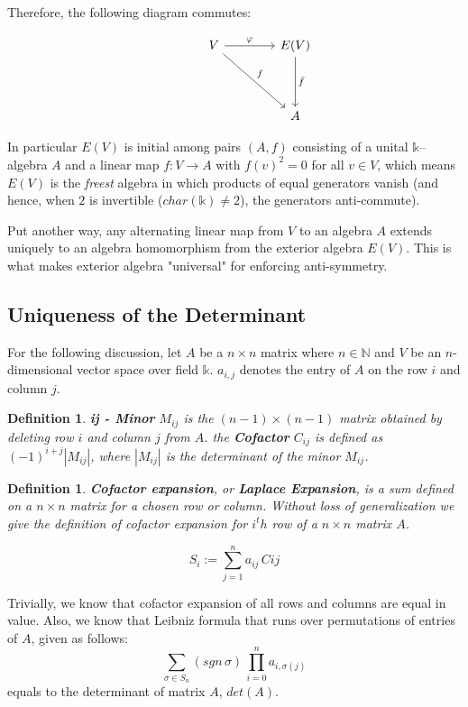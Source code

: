 \documentclass[12pt]{article}
\newtheorem{definition}[theorem]{Definition}
\numberwithin{theorem}{section}
\numberwithin{equation}{theorem}
\newcommand{\kk}{\mathds{k}}
\begin{document}
Therefore, the following diagram commutes:

$$
\begin{tikzcd}[row sep = 4em, column sep = 4em]
& V \arrow{r}{\varphi} \arrow{dr}{f} & E(V) \arrow{d}{\bar{f}} \\ & & A
\end{tikzcd}
$$

In particular $E(V)$ is initial among pairs $(A,f)$ consisting of a unital $\kk$–algebra $A$ and a linear map $f:V\to A$ with $f(v)^2=0$ for all $v\in V$, which means $E(V)$ is the \emph{freest} algebra in which products of equal generators vanish (and hence, when $2$ is invertible ($char(\kk) \neq 2$), the generators anti-commute). 

Put another way, any alternating linear map from $V$ to an algebra $A$ extends uniquely to an algebra homomorphism from the exterior algebra $E(V)$.
This is what makes exterior algebra "universal" for enforcing anti-symmetry.


\subsection{Uniqueness of the Determinant}
For the following discussion, let $A$ be a $n \times n$ matrix where $n \in \mathbb{N}$ and $V$ be an $n$-dimensional vector space over field $\kk$. $a_{i, j}$ denotes the entry of $A$ on the row $i$ and column $j$.

\begin{definition}
    \textbf{ij - Minor} $M_{ij}$ is the $(n-1) \times (n-1)$ matrix obtained by deleting row $i$ and column $j$ from $A$.
    the \textbf{Cofactor} $C_{ij}$ is defined as $(-1)^{i+j}\left| M_{ij}\right|$, where $\left| M_{ij}\right|$ is the determinant of the minor $M_{ij}$.
\end{definition}

\begin{definition}
    \textbf{Cofactor expansion}, or \textbf{Laplace Expansion}, is a sum defined on a $n \times n$ matrix for a chosen row or column. Without loss of generalization we give the definition of cofactor expansion for $i^th$ row of a $n \times n$ matrix $A$.

    $$S_i := \sum_{j = 1}^n a_{ij}\,C{ij}$$
\end{definition}
Trivially, we know that cofactor expansion of all rows and columns are equal in value.
Also, we know that Leibniz formula that runs over permutations of entries of $A$, given as follows:
$$\sum_{\sigma \in S_n}(sgn \,\sigma)\,\prod_{i = 0}^na_{i, \sigma(j)}$$
equals to the determinant of matrix $A$, $det(A)$.
\end{document}
